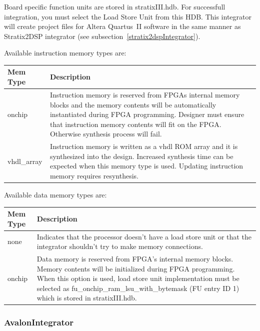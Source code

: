 \documentclass[twoside]{tceusermanual}
\begin{document}
Board specific function units are stored in stratixIII.hdb. For
successfull integration, you must select the Load Store Unit from this
HDB. This integrator will create project files for Altera Quartus~II
software in the same manner as Stratix2DSP integrator (see
subsection~\ref{stratix2dspIntegrator}).

Available instruction memory types are:
\begin{center}
\begin{longtable}[htb]{@{}p{}%
                     @{}p{}}

\textbf{Mem Type} &\textbf{Description} \\
\hline
onchip & Instruction memory is reserved from FPGAs internal memory blocks and
the memory contents will be automatically instantiated during FPGA programming.
Designer must ensure that instruction memory contents will fit on the FPGA.
Otherwise synthesis process will fail. \\
vhdl\_array & Instruction memory is written as a vhdl ROM array and it is
synthesized into the design. Increased synthesis time can be expected when this
memory type is used. Updating instruction memory requires resynthesis.
\end{longtable}
\end{center}

Available data memory types are:
\begin{center}
\begin{longtable}[htb]{@{}p{}%
                     @{}p{}}

\textbf{Mem Type} &\textbf{Description} \\
\hline
none & Indicates that the processor doesn't have a load store unit or that the
integrator shouldn't try to make memory connections. \\

onchip & Data memory is reserved from FPGA's internal memory
blocks. Memory contents will be initialized during FPGA
programming. When this option is used, load store unit implementation
must be selected as fu\_onchip\_ram\_lsu\_with\_bytemask (FU entry ID
1) which is stored in stratixIII.hdb.
\end{longtable}
\end{center}


\subsubsection{AvalonIntegrator}
\end{document}
